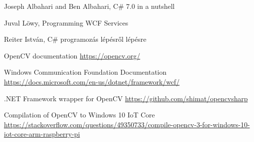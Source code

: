 \begin{thebibliography}{4}

Joseph Albahari and Ben Albahari, C\# 7.0 in a nutshell 

Juval Löwy, Programming WCF Services

 Reiter István, C\# programozás lépésről lépésre 

 OpenCV documentation \url{https://opencv.org/}

 Windows Communication Foundation Documentation \url{https://docs.microsoft.com/en-us/dotnet/framework/wcf/}

 .NET Framework wrapper for OpenCV \url{https://github.com/shimat/opencvsharp}

 Compilation of OpenCV to Windows 10 IoT Core \\ \url{https://stackoverflow.com/questions/49350733/compile-opencv-3-for-windows-10-iot-core-arm-raspberry-pi}

\end{thebibliography}

